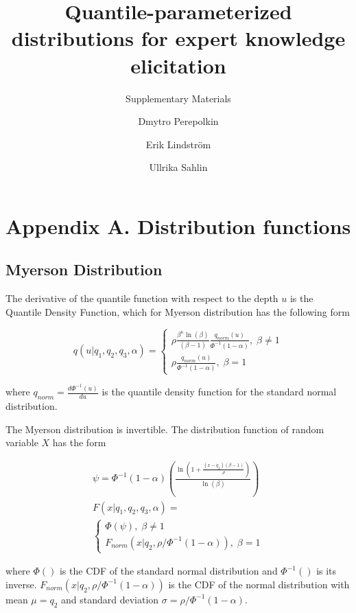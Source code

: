 \documentclass[
  letterpaper,
  DIV=11,
  numbers=noendperiod]{scrartcl}
\title{Quantile-parameterized distributions for expert knowledge
elicitation}
\subtitle{Supplementary Materials}
\author{Dmytro Perepolkin \and Erik Lindström \and Ullrika Sahlin}
\date{}
\begin{document}
\maketitle

\section*{Appendix A. Distribution
functions}\label{appendix-a.-distribution-functions}

\subsection*{Myerson Distribution}\label{myerson-distribution}

The derivative of the quantile function with respect to the depth \(u\)
is the Quantile Density Function, which for Myerson distribution has the
following form

\[
q(u\vert q_1,q_2,q_3,\alpha)=\begin{cases}
\rho\frac{\beta^\kappa\ln(\beta)}{(\beta-1)}\frac{q_{norm}(u)}{\Phi^{-1}(1-\alpha)}, \; \beta \neq 1\\
\rho\frac{q_{norm}(u)}{\Phi^{-1}(1-\alpha)}, \; \beta = 1
\end{cases}
\]

where \(q_{norm}=\frac{d\Phi^{-1}(u)}{du}\) is the quantile density
function for the standard normal distribution.

The Myerson distribution is invertible. The distribution function of
random variable \(X\) has the form

\[
\begin{gathered}
\psi=\Phi^{-1}(1-\alpha)\left(\frac{\ln\left(1+\frac{(x-q_2)(\beta-1)}{\rho}\right)}{\ln(\beta)}\right)\\
F(x\vert q_1, q_2, q_3, \alpha)=\\
\begin{cases}
\Phi(\psi), \; \beta\neq 1\\
F_{norm}(x\vert q_2,\rho/\Phi^{-1}(1-\alpha) ), \; \beta=1
\end{cases}
\end{gathered}
\]

where \(\Phi()\) is the CDF of the standard normal distribution and
\(\Phi^{-1}()\) is its inverse.
\(F_{norm}(x\vert q_2,\rho/\Phi^{-1}(1-\alpha))\) is the CDF of the
normal distribution with mean \(\mu=q_2\) and standard deviation
\(\sigma=\rho/\Phi^{-1}(1-\alpha)\).
\end{document}
